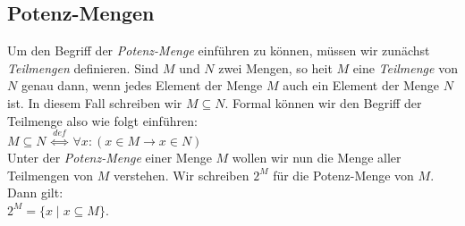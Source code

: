 \subsection{Potenz-Mengen}
Um den Begriff der \emph{Potenz-Menge} einf\"{u}hren zu k\"{o}nnen, m\"{u}ssen wir zun\"{a}chst 
\emph{Teilmengen} definieren.  Sind $M$ und $N$ zwei Mengen, so hei\3t $M$ eine
\emph{Teilmenge} von $N$ genau dann, wenn jedes Element der Menge $M$ auch ein Element der
Menge $N$ ist.  In diesem Fall schreiben wir $M \subseteq N$.  Formal k\"{o}nnen wir den
Begriff der Teilmenge also wie folgt einf\"{u}hren: \\[0.2cm]
\hspace*{1.3cm} $M \subseteq N \;\stackrel{de\!f}{\Longleftrightarrow}\; \forall x: (x \in M \rightarrow x \in N)$ \\[0.2cm]
Unter der \emph{Potenz-Menge} einer Menge $M$ wollen wir nun die Menge aller Teilmengen
von $M$ verstehen.  Wir schreiben $2^M$ f\"{u}r die Potenz-Menge von $M$.  Dann gilt: \\[0.2cm]
\hspace*{1.3cm} $2^M = \{ x \;|\; x \subseteq M \}$.

